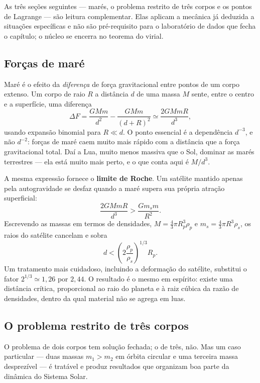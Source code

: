 \documentclass[11pt,a4paper]{article}
\begin{document}
\begin{noticebox}
As três seções seguintes --- marés, o problema restrito de três corpos e os pontos de Lagrange --- são leitura
complementar. Elas aplicam a mecânica já deduzida a situações específicas e não são pré-requisito para o laboratório de
dados que fecha o capítulo; o núcleo se encerra no teorema do virial.
\end{noticebox}

\subsection*{Forças de maré}

Maré é o efeito da \emph{diferença} de força gravitacional entre pontos de um corpo extenso. Um corpo de raio $R$ a distância $d$ de uma massa $M$ sente, entre o centro e a superfície, uma diferença
\[
\Delta F=\frac{GMm}{d^{2}}-\frac{GMm}{(d+R)^{2}}
\simeq\frac{2GMmR}{d^{3}},
\]
usando expansão binomial para $R\ll d$. O ponto essencial é a dependência $d^{-3}$, e não $d^{-2}$: forças de maré caem muito mais rápido com a distância que a força gravitacional total. Daí a Lua, muito menos massiva que o Sol, dominar as marés terrestres --- ela está muito mais perto, e o que conta aqui é $M/d^{3}$.

A mesma expressão fornece o \textbf{limite de Roche}. Um satélite mantido apenas pela autogravidade se desfaz quando a maré supera sua própria atração superficial:
\[
\frac{2GMmR}{d^{3}}>\frac{Gm_sm}{R^{2}}.
\]
Escrevendo as massas em termos de densidades, $M=\frac{4}{3}\pi R_p^{3}\rho_p$ e $m_s=\frac{4}{3}\pi R^{3}\rho_s$, os raios do satélite cancelam e sobra
\[
d<\left(2\frac{\rho_p}{\rho_s}\right)^{1/3}R_p.
\]
Um tratamento mais cuidadoso, incluindo a deformação do satélite, substitui o fator $2^{1/3}\simeq1{,}26$ por $2{,}44$. O resultado é o mesmo em espírito: existe uma distância crítica, proporcional ao raio do planeta e à raiz cúbica da razão de densidades, dentro da qual material não se agrega em luas.


\subsection*{O problema restrito de três corpos}

O problema de dois corpos tem solução fechada; o de três, não. Mas um caso particular --- duas massas $m_1>m_2$ em órbita circular e uma terceira massa desprezível --- é tratável e produz resultados que organizam boa parte da dinâmica do Sistema Solar.
\end{document}
